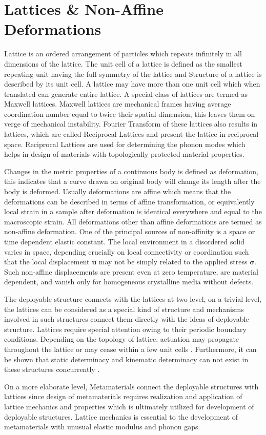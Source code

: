 \section{Lattices \& Non-Affine Deformations}
Lattice is an ordered arrangement of particles which repeats infinitely in all dimensions of the lattice. The unit cell of a lattice is defined as the smallest repeating unit having the full symmetry of the lattice and Structure of a lattice is described by its unit cell. A lattice may have more than one unit cell which when translated can generate entire lattice. A special class of lattices are termed as Maxwell lattices. Maxwell lattices are mechanical frames having average coordination number equal to twice their spatial dimension, this leaves them on verge of mechanical instability. Fourier Transform of these lattices also results in lattices, which are called Reciprocal Lattices and present the lattice in reciprocal space. Reciprocal Lattices are used for determining the phonon modes which helps in design of materials with topologically protected material properties.


Changes in the metric properties of a continuous body is defined as deformation, this indicates that a curve drawn on original body will change its length after the body is deformed. Usually deformations are affine which means that the deformations can be described in terms of affine transformation, or equivalently local strain in a sample after deformation is identical everywhere and equal to the macroscopic strain. All deformations other than affine deformations are termed as non-affine deformation. One of the principal sources of non-affinity is a space or time dependent elastic constant. The local environment in a disordered solid varies in space, depending crucially on local connectivity or coordination such that the local displacement $\textbf{u}$ may not be simply related to the applied stress $\boldsymbol{\sigma}$. Such non-affine displacements are present even at zero temperature, are material dependent, and vanish only for homogeneous crystalline media without defects\cite{Gang}.

The deployable structure connects with the lattices at two level, on a trivial level, the lattices can be considered as a special kind of structure and mechanisms involved in such structures connect them directly with the ideas of deployable structure. Lattices require special attention owing to their periodic boundary conditions. Depending on the topology of lattice, actuation may propagate throughout the lattice or may cease within a few unit cells \cite{Neli}. Furthermore, it can be shown that static determinacy and kinematic determinacy can not exist in these structures concurrently \cite{Gues}. 

On a more elaborate level, Metamaterials connect the deployable structures with lattices since design of metamaterials requires realization and application of lattice mechanics and properties which is ultimately utilized for development of deployable structures. Lattice mechanics is essential to the development of metamaterials with unusual elastic modulus and phonon gaps.\cite{Ma}

